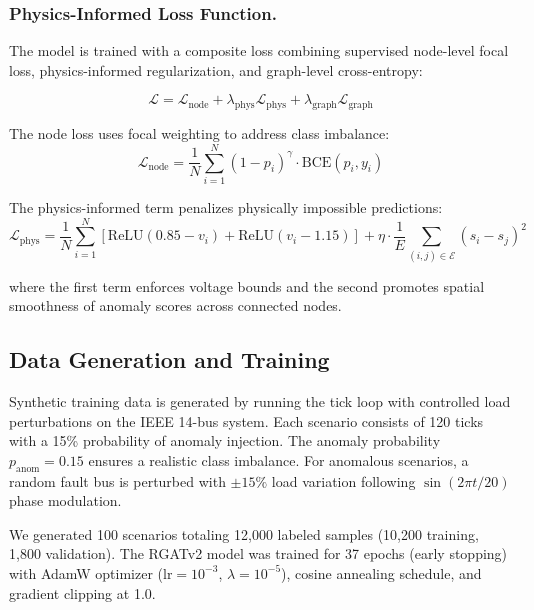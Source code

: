 \documentclass[conference]{IEEEtran}
\begin{document}
\subsubsection{Physics-Informed Loss Function.}

The model is trained with a composite loss combining supervised node-level focal loss, physics-informed regularization, and graph-level cross-entropy:

\begin{equation}
  \mathcal{L} = \mathcal{L}_{\text{node}} + \lambda_{\text{phys}} \mathcal{L}_{\text{phys}} + \lambda_{\text{graph}} \mathcal{L}_{\text{graph}}
\end{equation}

The node loss uses focal weighting to address class imbalance:
\begin{equation}
  \mathcal{L}_{\text{node}} = \frac{1}{N} \sum_{i=1}^N (1 - p_i)^\gamma \cdot \text{BCE}(p_i, y_i)
\end{equation}

The physics-informed term penalizes physically impossible predictions:
\begin{equation}
  \mathcal{L}_{\text{phys}} = \frac{1}{N} \sum_{i=1}^N \left[\text{ReLU}(0.85 - v_i) + \text{ReLU}(v_i - 1.15)\right] + \eta \cdot \frac{1}{E} \sum_{(i,j) \in \mathcal{E}} (s_i - s_j)^2
\end{equation}

where the first term enforces voltage bounds and the second promotes spatial smoothness of anomaly scores across connected nodes.

\subsection{Data Generation and Training}

Synthetic training data is generated by running the tick loop with controlled load perturbations on the IEEE 14-bus system. Each scenario consists of 120 ticks with a 15\% probability of anomaly injection. The anomaly probability $p_{\text{anom}} = 0.15$ ensures a realistic class imbalance. For anomalous scenarios, a random fault bus is perturbed with $\pm 15\%$ load variation following $\sin(2\pi t / 20)$ phase modulation.

We generated 100 scenarios totaling 12,000 labeled samples (10,200 training, 1,800 validation). The RGATv2 model was trained for 37 epochs (early stopping) with AdamW optimizer ($\text{lr} = 10^{-3}$, $\lambda = 10^{-5}$), cosine annealing schedule, and gradient clipping at 1.0.
\end{document}

